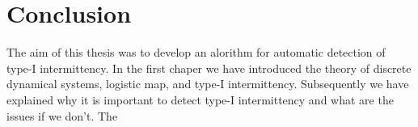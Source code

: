 \chapter{Conclusion}

The aim of this thesis was to develop an alorithm for automatic detection of type-I intermittency.
In the first chaper we have introduced the theory of discrete dynamical systems, logistic map, and type-I intermittency.
Subsequently we have explained why it is important to detect type-I intermittency and what are the issues if we don't.
The 

\endinput